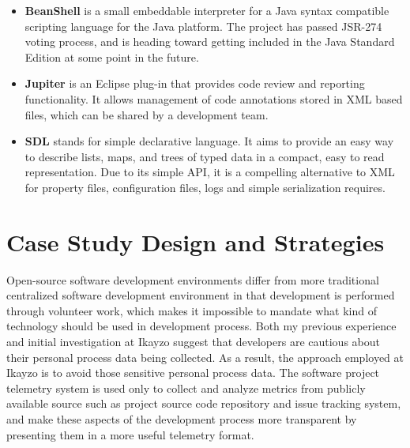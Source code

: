 \begin{itemize}

	\item \textbf{BeanShell} is a small embeddable interpreter for a Java syntax compatible scripting language for the Java platform. The project has passed JSR-274 voting process, and is heading toward getting included in the Java Standard Edition at some point in the future.

	\item \textbf{Jupiter} is an Eclipse plug-in that provides code review and reporting functionality. It allows management of code annotations stored in XML based files, which can be shared by a development team.
	
	\item \textbf{SDL} stands for simple declarative language. It aims to provide an easy way to describe lists, maps, and trees of typed data in a compact, easy to read representation. Due to its simple API, it is a compelling alternative to XML for property files, configuration files, logs and simple serialization requires.	

\end{itemize}









\section{Case Study Design and Strategies} \label{EvaluationInIkayzo:Design}

Open-source software development environments differ from more traditional centralized software development environment in that development is performed through volunteer work, which makes it impossible to mandate what kind of technology should be used in development process. Both my previous experience and initial investigation at Ikayzo suggest that developers are cautious about their personal process data being collected. As a result, the approach employed at Ikayzo is to avoid those sensitive personal process data. The software project telemetry system is used only to collect and analyze metrics from publicly available source such as project source code repository and issue tracking system, and make these aspects of the development process more transparent by presenting them in a more useful telemetry format.

